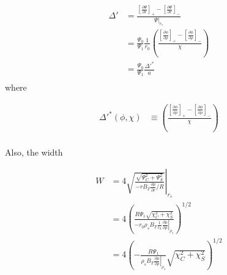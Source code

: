 \documentclass{article}
\begin{document}
\begin{equation} \label{wessonCurrentProfile}
\begin{split}
\Delta'&=\frac{ \left[\frac{\partial \Psi}{\partial r}\right]_{+}-\left[\frac{\partial \Psi}{\partial r}\right]_{-}}{\left.\Psi \right|_{r_s}}\\
& = \frac{\Psi_0}{\Psi_1}\frac{1}{r_0} \left(\frac{ \left[\frac{\partial \phi}{\partial \rho}\right]_{+}-\left[\frac{\partial \phi}{\partial \rho}\right]_{-}}{\chi}\right)\\
& = \frac{\Psi_0}{\Psi_1}\frac{\Delta'^{*} }{a} \\
\end{split} 
\end{equation} 
where

\begin{equation} \label{wessonCurrentProfile}
\begin{split}
\Delta'^*(\phi, \chi)& \equiv \left(\frac{ \left[\frac{\partial \phi}{\partial \rho}\right]_{+}-\left[\frac{\partial \phi}{\partial \rho}\right]_{-}}{\chi}\right)\\
\end{split} 
\end{equation} 

Also, the width

\begin{equation} \label{wessonCurrentProfile}
\begin{split}
W & = \left. 4 \sqrt{ \frac{\sqrt{\Psi_C^2+\Psi_S^2}}{-r B_T\frac{\partial \mu}{\partial r}/R}} \right|_{r_s}\\
&= 4 \left( \frac{R \Psi_1 \sqrt{\chi_C^2+\chi_S^2}}{-r_0 \rho_s B_T \frac{1}{r_0}\left.\frac{\partial \mu}{\partial \rho}\right|_{\rho_s}}\right)^{1/2} \\
&= 4 \left( - \frac{R \Psi_1 }{\rho_s B_T \left.\frac{\partial \mu}{\partial \rho}\right|_{\rho_s}}\sqrt{\chi_C^2+\chi_S^2}\right)^{1/2}\\
\end{split} 
\end{equation} 
\end{document}
